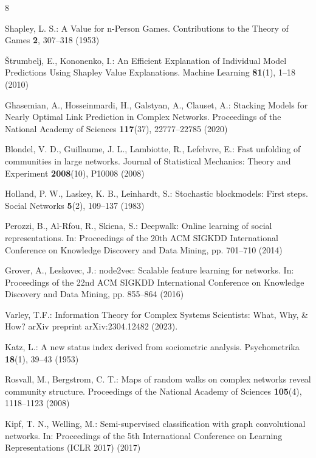 \begin{thebibliography}{8}

Shapley, L. S.: A Value for n-Person Games. Contributions to the Theory of Games \textbf{2}, 307--318 (1953)

Štrumbelj, E., Kononenko, I.: An Efficient Explanation of Individual Model Predictions Using Shapley Value Explanations. Machine Learning \textbf{81}(1), 1--18 (2010)

Ghasemian, A., Hosseinmardi, H., Galstyan, A., Clauset, A.: Stacking Models for Nearly Optimal Link Prediction in Complex Networks. Proceedings of the National Academy of Sciences \textbf{117}(37), 22777--22785 (2020)

Blondel, V. D., Guillaume, J. L., Lambiotte, R., Lefebvre, E.: Fast unfolding of communities in large networks. Journal of Statistical Mechanics: Theory and Experiment \textbf{2008}(10), P10008 (2008)

Holland, P. W., Laskey, K. B., Leinhardt, S.: Stochastic blockmodels: First steps. Social Networks \textbf{5}(2), 109--137 (1983)

Perozzi, B., Al-Rfou, R., Skiena, S.: Deepwalk: Online learning of social representations. In: Proceedings of the 20th ACM SIGKDD International Conference on Knowledge Discovery and Data Mining, pp. 701--710 (2014)

Grover, A., Leskovec, J.: node2vec: Scalable feature learning for networks. In: Proceedings of the 22nd ACM SIGKDD International Conference on Knowledge Discovery and Data Mining, pp. 855--864 (2016)

Varley, T.F.: Information Theory for Complex Systems Scientists: What, Why, \& How? arXiv preprint arXiv:2304.12482 (2023). 

Katz, L.: A new status index derived from sociometric analysis. Psychometrika \textbf{18}(1), 39--43 (1953)

Rosvall, M., Bergstrom, C. T.: Maps of random walks on complex networks reveal community structure. Proceedings of the National Academy of Sciences \textbf{105}(4), 1118--1123 (2008)

Kipf, T. N., Welling, M.: Semi-supervised classification with graph convolutional networks. In: Proceedings of the 5th International Conference on Learning Representations (ICLR 2017) (2017)


\end{thebibliography}
